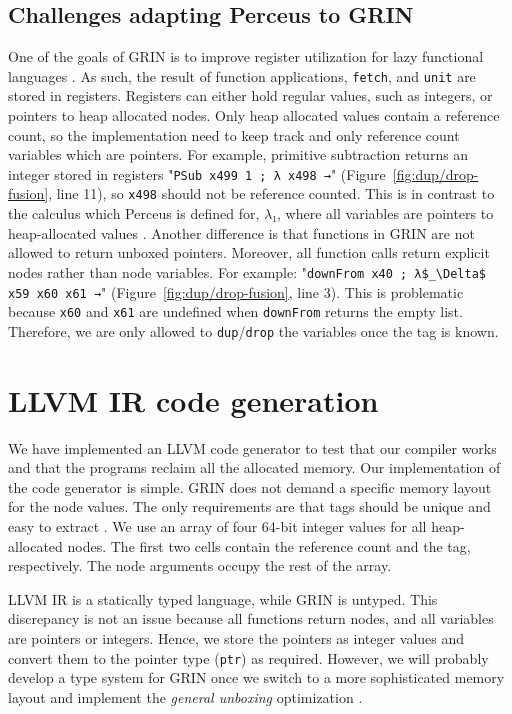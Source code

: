 \documentclass[9pt, twocolumn]{article}
\begin{document}
\subsection{Challenges adapting Perceus to GRIN}
\label{sec:perceus-challanges}
One of the goals of GRIN is to improve register utilization for lazy functional languages \mbox{\citep{boquist1999}}.
As such, the result of function applications, \lstinline{fetch}, and \lstinline{unit} are stored in registers.
Registers can either hold regular values, such as integers, or pointers to heap allocated nodes.
Only heap allocated values contain a reference count, so the implementation need to keep track and only reference count variables which are pointers. 
For example, primitive subtraction returns an integer stored in registers "\lstinline{PSub x499 1 ; λ x498 →}" \mbox{(Figure \ref{fig:dup/drop-fusion}}, line 11), so \lstinline{x498} should not be reference counted.
This is in contrast to the calc\-ulus which Perceus is defined for, $λ₁$, where all variables are pointers to heap-allocated values \citep{reinking2021}.
Another difference is that functions in GRIN are not allowed to return unboxed pointers. 
Moreover, all function calls ret\-urn explicit nodes rather than node variables. 
For example: "\lstinline{downFrom x40 ; λ$_\Delta$ x59 x60 x61 →}" (\mbox{Figure \ref{fig:dup/drop-fusion}}, line 3).
This is problematic because \lstinline{x60} and \lstinline{x61} are undefined when \lstinline{downFrom} returns the empty list.
Therefore, we are only allowed to \lstinline{dup}/\lstinline{drop} the variables once the tag is known.

\section{LLVM IR code generation}
\label{sec:llvm-codegen}
We have implemented an LLVM code generator to test that our compiler works and that the programs reclaim all the allocated memory. 
Our implementation of the code generator is simple. 
GRIN does not demand a specific memory layout for the node values.
The only requirements are that tags should be unique and easy to extract \citep{boquist1999}.
We use an array of four 64-bit integer values for all heap-allocated nodes. 
The first two cells contain the reference count and the tag, respectively.
The node arguments occupy the rest of the array.

LLVM IR is a statically typed language, while GRIN is untyped.
This discrepancy is not an issue because all functions return nodes, and all variables are pointers or integers.
Hence, we store the pointers as integer values and convert them to the pointer type (\lstinline{ptr}) as required.
However, we will probably develop a type system for GRIN once we switch to a more sophisticated memory layout and implement the \emph{general unboxing} optimization \citep{boquist1999}.
\end{document}
